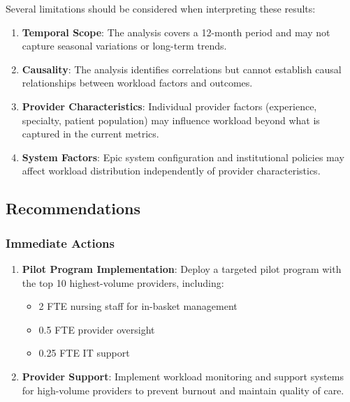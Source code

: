 \documentclass[
  11pt,
]{article}
\providecommand{\tightlist}{%
  \setlength{\itemsep}{0pt}\setlength{\parskip}{0pt}}\usepackage{longtable,booktabs,array}
\begin{document}
Several limitations should be considered when interpreting these
results:

\begin{enumerate}
\def\labelenumi{\arabic{enumi}.}
\tightlist
\item
  \textbf{Temporal Scope}: The analysis covers a 12-month period and may
  not capture seasonal variations or long-term trends.
\item
  \textbf{Causality}: The analysis identifies correlations but cannot
  establish causal relationships between workload factors and outcomes.
\item
  \textbf{Provider Characteristics}: Individual provider factors
  (experience, specialty, patient population) may influence workload
  beyond what is captured in the current metrics.
\item
  \textbf{System Factors}: Epic system configuration and institutional
  policies may affect workload distribution independently of provider
  characteristics.
\end{enumerate}

\subsection{Recommendations}\label{recommendations-1}

\subsubsection{Immediate Actions}\label{immediate-actions}

\begin{enumerate}
\def\labelenumi{\arabic{enumi}.}
\tightlist
\item
  \textbf{Pilot Program Implementation}: Deploy a targeted pilot program
  with the top 10 highest-volume providers, including:

  \begin{itemize}
  \tightlist
  \item
    2 FTE nursing staff for in-basket management
  \item
    0.5 FTE provider oversight
  \item
    0.25 FTE IT support
  \end{itemize}
\item
  \textbf{Provider Support}: Implement workload monitoring and support
  systems for high-volume providers to prevent burnout and maintain
  quality of care.
\end{enumerate}
\end{document}
